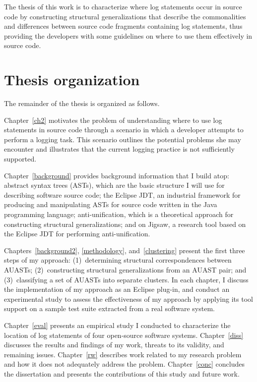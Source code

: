 The thesis of this work is to characterize where log statements occur in source code by constructing structural generalizations that describe the commonalities and differences between source code fragments containing log statements, thus providing the developers with some guidelines on where to use them effectively in source code.

\section{Thesis organization} \label{intro-org}
The remainder of the thesis is organized as follows.

Chapter~\ref{ch2} motivates the problem of understanding where to use log statements in source code through a scenario in which a developer attempts to perform a logging task. This scenario outlines the potential problems she may encounter and illustrates that the current logging practice is not sufficiently supported.

Chapter~\ref{background} provides background information that I build atop: abstract syntax trees (ASTs), which are the basic structure I will use for describing software source code; the Eclipse JDT, an industrial framework for producing and manipulating ASTs for source code written in the Java programming language; anti-unification, which is a theoretical approach for constructing structural generalizations; and on Jigsaw, a research tool based on the Eclipse JDT for performing anti-unification.


Chapters~\ref{background2}, \ref{methodology}, and~\ref{clustering} present the first three steps of my approach: (1)~determining structural correspondences between AUASTs; (2)~constructing structural generalizations from an AUAST pair; and (3)~classifying a set of AUASTs into separate clusters. In each chapter, I discuss the implementation of my approach as an Eclipse plug-in, and conduct an experimental study to assess the effectiveness of my approach by applying its tool support on a sample test suite extracted from a real software system.



Chapter~\ref{eval} presents an empirical study I conducted to characterize the location of log statements of four open-source software systems. Chapter~\ref{diss} discusses the results and findings of my work, threats to its validity, and remaining issues. Chapter~\ref{rw} describes work related to my research problem and how it does not adequately address the problem. Chapter~\ref{conc} concludes the dissertation and presents the contributions of this study and future work. %



